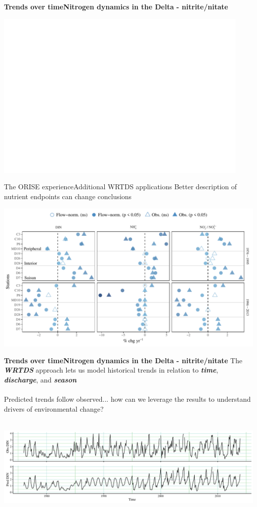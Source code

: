 \documentclass[serif]{beamer}\usepackage[]{graphicx}\usepackage[]{color}
\newcommand{\emtxt}[1]{\textbf{\textit{#1}}}
\begin{document}
\begin{frame}{\textbf{Trends over time}}{\textbf{Nitrogen dynamics in the Delta - nitrite/nitate}} 
\centerline{\includegraphics[width = 0.93\textwidth, page = 2]{fig/trndsperno23.pdf}}
\end{frame}

\begin{frame}{The ORISE experience}{Additional WRTDS applications}
Better description of nutrient endpoints can change conclusions
\centerline{\includegraphics[width = \textwidth]{fig/trndcomp1.pdf}}
\end{frame}



\begin{frame}{\textbf{Trends over time}}{\textbf{Nitrogen dynamics in the Delta - nitrite/nitate}} 
The \emtxt{WRTDS} approach lets us model historical trends in relation to \emtxt{time}, \emtxt{discharge}, and \emtxt{season}\\~\\
Predicted trends follow observed... how can we leverage the results to understand drivers of environmental change? \\~\\
\centerline{\includegraphics[width = \textwidth]{fig/ts_ex2.pdf}}
\end{frame}
\end{document}
